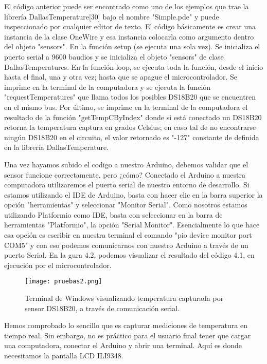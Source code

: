 \par \noindent
El código anterior puede ser encontrado como uno de los ejemplos que trae la librería DallasTemperature[30] bajo el nombre "Simple.pde" y puede inspeccionado por cualquier editor de texto. El código básicamente es crear una instancia de la clase OneWire y esa instancia colocarla como argumento dentro del objeto "sensors". En la función setup (se ejecuta una sola vez). Se inicializa el puerto serial a 9600 baudios y se inicializa el objeto "sensors" de clase DallasTemperatures. En la función loop, se ejecuta toda la función, desde el inicio hasta el  final, una y otra vez; hasta que se apague el microcontrolador. Se imprime en la terminal de la computadora y se ejecuta la función "requestTemperatures" que llama todos los posibles DS18B20 que se encuentren en el mismo bus. Por último, se imprime en la terminal de la computadora el resultado de la función "getTempCByIndex" donde si está conectado un DS18B20 retorna la temperatura captura en grados Celsius; en caso tal de no encontrarse ningún DS18B20 en el circuito, el valor retornado es "-127" constante de definida en la librería DallasTemperature.

\par \noindent
Una vez hayamos subido el codigo a nuestro Arduino, debemos validar que el sensor funcione correctamente, pero ¿cómo? Conectado el Arduino a nuestra computadora utilizaremos el puerto serial de nuestro entorno de desarrollo. Si estamos utilizando el IDE de Arduino, basta con hacer clic en la barra superior la opción "herramientas" y seleccionar "Monitor Serial". Como nosotros estamos utilizando Platformio como IDE, basta con seleccionar en la barra de herramientas "Platformio", la opción "Serial Monitor". Esencialmente lo que hace esa opción es escribir en nuestra terminal el comando "pio device monitor  port COM5" y con eso podemos comunicarnos con nuestro Arduino a través de un puerto Serial. En la  gura 4.2, podemos visualizar el resultado del código 4.1, en ejecución por el microcontrolador.

\begin{figure}[H]
	\centering
	\texttt{[image: pruebas2.png]}
	\caption{Terminal de Windows visualizando temperatura capturada por sensor DS18B20, a través de comunicación serial.}
\end{figure}

\par \noindent
Hemos comprobado lo sencillo que es capturar mediciones de temperatura en tiempo real. Sin embargo, no es práctico para el usuario final tener que cargar una computadora, conectar el Arduino y abrir una terminal. Aquí es donde necesitamos la pantalla LCD ILI9348.

